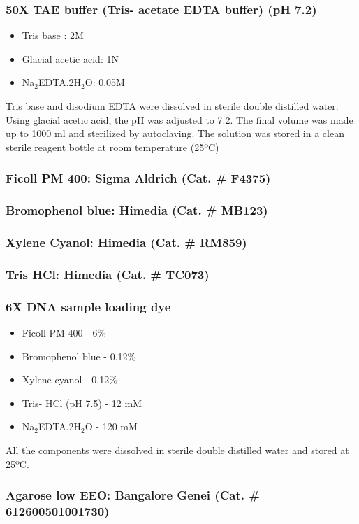 \begin{refsection}
\subsubsection{50X TAE buffer (Tris- acetate EDTA buffer)  (pH 7.2)}
\begin{itemize} 
\setlength{\itemindent}{+.5in}
\item Tris base : 2M
\item Glacial acetic acid: 1N
\item Na$_2$EDTA.2H$_2$O:  0.05M
\end{itemize}
	Tris base and disodium EDTA were dissolved in sterile double distilled water. Using glacial acetic acid, the pH was adjusted to 7.2. The final volume was made up to 1000 ml and sterilized by autoclaving. The solution was stored in a clean sterile reagent bottle at room temperature (25ºC) 
\subsubsection{Ficoll PM 400: \textmd{Sigma Aldrich (Cat. \# F4375)}}
\subsubsection{Bromophenol blue: \textmd{Himedia (Cat. \# MB123)}}
\subsubsection{Xylene Cyanol: \textmd{ Himedia (Cat. \# RM859)}}
\subsubsection{Tris HCl: \textmd{Himedia (Cat. \# TC073)}}
\subsubsection{6X DNA sample loading dye}
\begin{itemize} 
\setlength{\itemindent}{+.5in}
\item Ficoll PM 400 - 6\%
\item Bromophenol blue  - 0.12\%
\item Xylene cyanol  - 0.12\%
\item Tris- HCl (pH 7.5) - 12 mM
\item Na$_2$EDTA.2H$_2$O - 120 mM
\end{itemize}
All the components were dissolved in sterile double distilled water and stored at 25ºC.
\subsubsection{Agarose low EEO: \textmd{Bangalore Genei (Cat. \# 612600501001730)}} 

\end{refsection}
